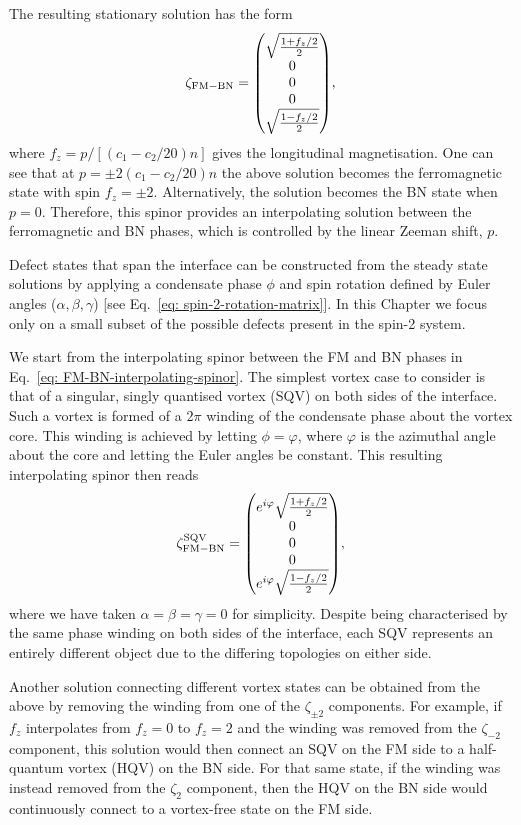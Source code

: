 The resulting stationary solution has the form
\begin{equation}\label{eq: FM-BN-interpolating-spinor}
    \zeta_\mathrm{FM-BN} = \mqty(\sqrt{\frac{1 + f_z/2}{2}} \\ 0 \\ 0 \\ 0 \\
    \sqrt{\frac{1 - f_z/2}{2}}),
\end{equation}
where \(f_z = p / [(c_1-c_2/20)n]\) gives the longitudinal magnetisation.
One can see that at \(p = \pm 2(c_1-c_2/20)n\) the above solution becomes
the ferromagnetic state with spin \(f_z = \pm 2\).
Alternatively, the solution becomes the BN state when \(p=0\).
Therefore, this spinor provides an interpolating solution between the
ferromagnetic and BN phases, which is controlled by the linear Zeeman shift,
\(p\).

Defect states that span the interface can be constructed from the steady state
solutions by applying a condensate phase \(\phi \) and spin rotation defined by
Euler angles (\(\alpha, \beta, \gamma \))
[see Eq.~\eqref{eq: spin-2-rotation-matrix}].
In this Chapter we focus only on a small subset of the possible defects present
in the spin-2 system.

We start from the interpolating spinor between the FM and BN phases in
Eq.~\eqref{eq: FM-BN-interpolating-spinor}.
The simplest vortex case to consider is that of a singular, singly quantised
vortex (SQV) on both sides of the interface.
Such a vortex is formed of a \(2\pi \) winding of the condensate phase about
the vortex core.
This winding is achieved by letting \(\phi = \varphi \), where \(\varphi \) is
the azimuthal angle about the core and letting the Euler angles be constant.
This resulting interpolating spinor then reads
\begin{equation}
    \zeta_\mathrm{FM-BN}^\mathrm{SQV} =
    \mqty(e^{i\varphi}\sqrt{\frac{1 + f_z/2}{2}} \\ 0 \\ 0 \\ 0 \\
    e^{i\varphi}\sqrt{\frac{1 - f_z/2}{2}}),
\end{equation}
where we have taken \(\alpha=\beta=\gamma=0\) for simplicity.
Despite being characterised by the same phase winding on both sides of the
interface, each SQV represents an entirely different object due to the
differing topologies on either side.

Another solution connecting different vortex states can be obtained from the
above by removing the winding from one of the \(\zeta_{\pm 2}\) components.
For example, if \(f_z\) interpolates from \(f_z=0\) to \(f_z=2\) and the winding
was removed from the \(\zeta_{-2}\) component, this solution would then connect
an SQV on the FM side to a half-quantum vortex (HQV) on the BN side.
For that same state, if the winding was instead removed from the \(\zeta_{2}\)
component, then the HQV on the BN side would continuously connect to a
vortex-free state on the FM side.

